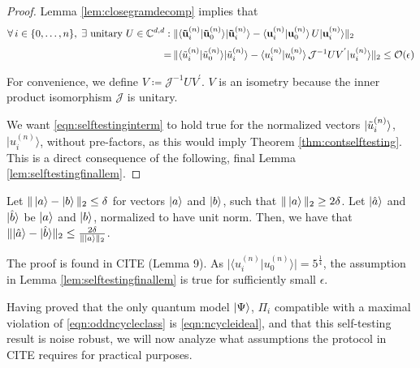 \begin{proof}
Lemma \ref{lem:closegramdecomp} implies that 
\begin{align}
\label{eqn:selftestinginterm}
\begin{split}
    \forall\thinspace i\in\{0,\dots,n\},\; \exists \text{ unitary } U\in\mathbb{C}^{d,d}: \; & \| \langle \mathbf{\Tilde{u}}_i^{(n)} \vert \mathbf{\Tilde{u}}_0^{(n)} \rangle \vert \mathbf{\Tilde{u}}_i^{(n)} \rangle - \langle \mathbf{u}_i^{(n)} \vert \mathbf{u}_0^{(n)} \rangle \thinspace U\vert \mathbf{u}_i^{(n)}\rangle\|_2 \\[0.3em]
    = \thinspace & \| \langle \Tilde{u}_i^{(n)} \vert \Tilde{u}_0^{(n)} \rangle \vert \Tilde{u}_i^{(n)} \rangle - \langle u_i^{(n)} \vert u_0^{(n)} \rangle \thinspace \mathcal{J}^{-1}UV^{'} \vert u_i^{(n)}\rangle\|_2 \leq \mathcal{O}(\epsilon)
\end{split}
\end{align}

For convenience, we define $V\coloneqq \mathcal{J}^{-1}UV^{'}$. $V$ is an isometry because the inner product isomorphism $\mathcal{J}$ is unitary. 

We want \ref{eqn:selftestinginterm} to hold true for the normalized vectors $\vert \Tilde{u}_i^{(n)} \rangle$, $\vert u_i^{(n)}\rangle$, without pre-factors, as this would imply Theorem \ref{thm:contselftesting}. This is a direct consequence of the following, final Lemma \ref{lem:selftestingfinallem}.
\end{proof}

\begin{lemma}[CITE]
\label{lem:selftestingfinallem}
Let $\| \ket{a} - \ket{b} \|_2\leq\delta$ for vectors $\ket{a}$ and $\ket{b}$, such that $\|\ket{a}\|_2\geq2\delta$. Let $\vert \Hat{a} \rangle$ and $\vert \Hat{b} \rangle$ be $\ket{a}$ and $\ket{b}$, normalized to have unit norm. Then, we have that $\| \vert \Hat{a}\rangle-\vert \Hat{b} \rangle \|_2\leq \frac{2\delta}{\|\ket{a}\|_2}$.
\end{lemma}
The proof is found in CITE (Lemma 9). As $\vert \langle u_i^{(n)}\vert u_0^{(n)} \rangle \vert =5^{\frac{1}{4}}$, the assumption in Lemma \ref{lem:selftestingfinallem} is true for sufficiently small $\epsilon$.

Having proved that the only quantum model $\ket{\Psi}$, $\Pi_i$ compatible with a maximal violation of \ref{eqn:oddncycleclass} is \ref{eqn:ncycleideal}, and that this self-testing result is noise robust, we will now analyze what assumptions the protocol in CITE requires for practical purposes.

